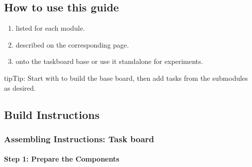 \documentclass[letterpaper,10pt,english]{sphinxmanual}
\begin{document}
\subsection{How to use this guide}
\label{\detokenize{wbk_challenge_overview:how-to-use-this-guide}}\begin{enumerate}
%
\item {} 
\sphinxAtStartPar
{} listed for each module.

\item {} 
\sphinxAtStartPar
{} described on the corresponding page.

\item {} 
\sphinxAtStartPar
{} onto the taskboard base or use it stand\sphinxhyphen{}alone for experiments.

\end{enumerate}

\begin{sphinxadmonition}{tip}{Tip:}
\sphinxAtStartPar
Start with  to build the base board, then add tasks from the submodules as desired.
\end{sphinxadmonition}


\subsection{Build Instructions}
\label{\detokenize{wbk_challenge_overview:build-instructions}}
\sphinxstepscope


\subsubsection{Assembling Instructions: Task board}
\label{\detokenize{0-Assembly_Instructions_Taskboard:assembling-instructions-task-board}}\label{\detokenize{0-Assembly_Instructions_Taskboard::doc}}

\paragraph{Step 1: Prepare the Components}
\label{\detokenize{0-Assembly_Instructions_Taskboard:step-1-prepare-the-components}}
\end{document}
